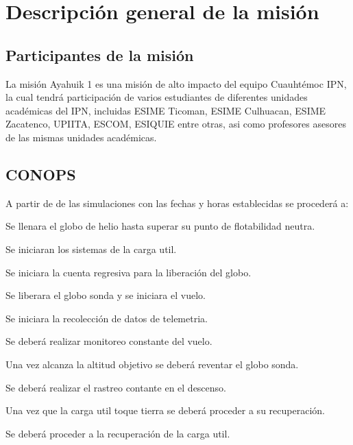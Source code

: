 \documentclass[letterpaper,12pt]{article} %
\begin{document}
    \newpage

\section{Descripción general de la misión}

    \subsection{Participantes de la misión}

    La misión Ayahuik 1 es una misión de alto impacto del equipo Cuauhtémoc IPN, la cual tendrá
    participación de varios estudiantes de diferentes unidades académicas del IPN, incluidas ESIME Ticoman, 
    ESIME Culhuacan, ESIME Zacatenco, UPIITA, ESCOM, ESIQUIE entre otras, asi como profesores asesores de las mismas 
    unidades académicas.

    \subsection{CONOPS}

    A partir de de las simulaciones con las fechas y horas establecidas se procederá a:

    \medskip   \qquad Se llenara el globo de helio hasta superar su punto de flotabilidad neutra.

    \medskip   \qquad Se iniciaran los sistemas de la carga util.

    \medskip   \qquad Se iniciara la cuenta regresiva para la liberación del globo.
    
    \vspace{5mm}

    Se liberara el globo sonda y se iniciara el vuelo.

    \medskip   \qquad Se iniciara la recolección de datos de telemetria.

    \medskip   \qquad Se deberá realizar monitoreo constante del vuelo.

    \medskip   \qquad Una vez alcanza la altitud objetivo se deberá reventar el globo sonda.

    \medskip   \qquad Se deberá realizar el rastreo contante en el descenso.
    
    \vspace{5mm}

    Una vez que la carga util toque tierra se deberá proceder a su recuperación.

    \medskip   \qquad Se deberá proceder a la recuperación de la carga util.
\end{document}
